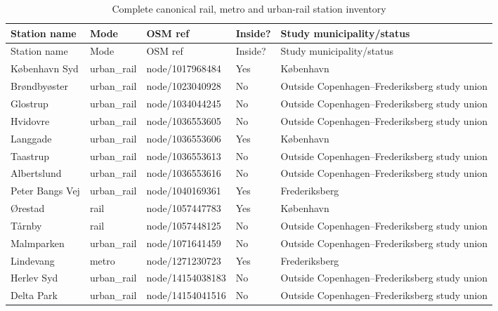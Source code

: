 \begin{landscape}
\small
\begin{longtable}{>{\raggedright\arraybackslash}p{8.0cm}>{\raggedright\arraybackslash}p{2.4cm}>{\raggedright\arraybackslash}p{3.7cm}>{\raggedright\arraybackslash}p{1.5cm}>{\raggedright\arraybackslash}p{5.2cm}}
\caption{Complete canonical rail, metro and urban-rail station inventory}\label{tab:destination-stations}\\
\toprule
Station name & Mode & OSM ref & Inside? & Study municipality/status \\
\midrule
\endfirsthead
\toprule
Station name & Mode & OSM ref & Inside? & Study municipality/status \\
\midrule
\endhead
København Syd & urban\_\allowbreak{}rail & node/1017968484 & Yes & København \\
Brøndbyøster & urban\_\allowbreak{}rail & node/1023040928 & No & Outside Copenhagen--Frederiksberg study union \\
Glostrup & urban\_\allowbreak{}rail & node/1034044245 & No & Outside Copenhagen--Frederiksberg study union \\
Hvidovre & urban\_\allowbreak{}rail & node/1036553605 & No & Outside Copenhagen--Frederiksberg study union \\
Langgade & urban\_\allowbreak{}rail & node/1036553606 & Yes & København \\
Taastrup & urban\_\allowbreak{}rail & node/1036553613 & No & Outside Copenhagen--Frederiksberg study union \\
Albertslund & urban\_\allowbreak{}rail & node/1036553616 & No & Outside Copenhagen--Frederiksberg study union \\
Peter Bangs Vej & urban\_\allowbreak{}rail & node/1040169361 & Yes & Frederiksberg \\
Ørestad & rail & node/1057447783 & Yes & København \\
Tårnby & rail & node/1057448125 & No & Outside Copenhagen--Frederiksberg study union \\
Malmparken & urban\_\allowbreak{}rail & node/1071641459 & No & Outside Copenhagen--Frederiksberg study union \\
Lindevang & metro & node/1271230723 & Yes & Frederiksberg \\
Herlev Syd & urban\_\allowbreak{}rail & node/14154038183 & No & Outside Copenhagen--Frederiksberg study union \\
Delta Park & urban\_\allowbreak{}rail & node/14154041516 & No & Outside Copenhagen--Frederiksberg study union \\

\end{longtable}
\end{landscape}
